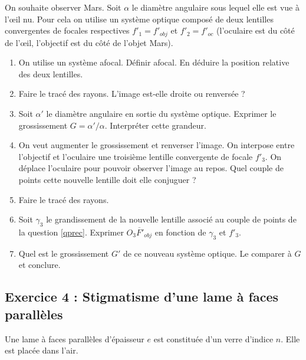 On souhaite observer Mars. Soit $\alpha$ le diamètre angulaire sous lequel elle est vue à l'œil nu. Pour cela on utilise un système optique composé de deux lentilles convergentes de focales respectives $f'_1=f'_{obj}$ et $f'_2=f'_{oc}$ (l'oculaire est du côté de l'œil, l'objectif est du côté de l'objet Mars).

\begin{enumerate}
	\item On utilise un système afocal. Définir afocal. En déduire la position relative des deux lentilles.
	\item Faire le tracé des rayons. L'image est-elle droite ou renversée ?
	\item Soit $\alpha'$ le diamètre angulaire en sortie du système optique. Exprimer le grossissement $G = \alpha'/\alpha$. Interpréter cette grandeur.
	\item \label{qprec} On veut augmenter le grossissement et renverser l'image. On interpose entre l'objectif et l'oculaire une troisième lentille convergente de focale $f'_3$. On déplace l'oculaire pour pouvoir observer l'image au repos. Quel couple de points cette nouvelle lentille doit elle conjuguer ?
	\item Faire le tracé des rayons.
	\item Soit $\gamma_3$ le grandissement de la nouvelle lentille associé au couple de points de la question \ref{qprec}. Exprimer $\overline{O_3F'_{obj}}$ en fonction de $\gamma_3$ et $f'_3$.
	\item Quel est le grossissement $G'$ de ce nouveau système optique. Le comparer à $G$ et conclure.
\end{enumerate}


\subsection{Exercice 4 : Stigmatisme d'une lame à faces parallèles}

Une lame à faces parallèles d'épaisseur $e$ est constituée d'un verre d'indice $n$. Elle est placée dans l'air. 

